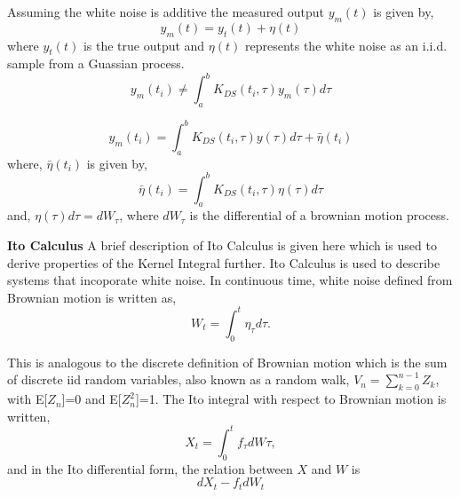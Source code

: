 \documentclass{article}
\begin{document}
Assuming the white noise is additive the measured output $y_m(t)$ is given by, 
\begin{equation}
	y_m(t) = y_t(t) + \eta(t)
\end{equation}
where $y_t(t)$ is the true output and $\eta(t)$ represents the white noise as an i.i.d. sample from a Guassian process. 
\begin{equation}
	y_m(t_i) \neq \int_a^b K_{DS}(t_i,\tau) y_m(\tau)d\tau
\end{equation}

\begin{equation}
	y_m(t_i) = \int_a^b K_{DS}(t_i,\tau) y(\tau)d\tau + \bar{\eta}(t_i)
\end{equation}
where, $\bar{\eta}(t_i)$ is given by, 
\begin{equation}
	\label{eq:kernel_noise}
	\bar{\eta}(t_i) = \int_a^b K_{DS}(t_i,\tau) \eta(\tau)d\tau
\end{equation} 
and, $\eta(\tau)d\tau = dW_\tau$, where $dW_\tau$ is the differential of a brownian motion process. 

\textbf{Ito Calculus}
A brief description of Ito Calculus is given here which is used to derive properties of the Kernel Integral further. Ito Calculus is used to describe systems that incoporate white noise. In continuous time, white noise defined from Brownian motion is written as, 
\begin{equation}
W_t = \int_0^t \eta_\tau d\tau .
\end{equation}

This is analogous to the discrete definition of Brownian motion which is the sum of discrete iid random variables, also known as a random walk, $V_n = \sum_{k=0}^{n-1} Z_k$, with E[$Z_n$]=0 and E[$Z_n^2$]=1. The Ito integral with respect to Brownian motion is written, 
\begin{equation}
X_t = \int_0^t f_\tau dW\tau,
\end{equation} 
and in the Ito differential form, the relation between $X$ and $W$ is 
\begin{equation}
dX_t - f_tdW_t
\end{equation}
\end{document}
